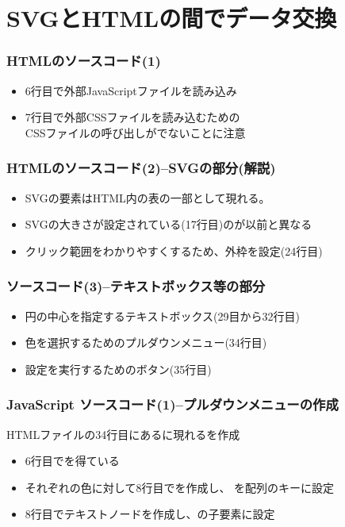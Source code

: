 

\frame{\maketitle}
\section{SVGとHTMLの間でデータ交換}
\begin{frame}[containsverbatim]
 \frametitle{HTMLのソースコード(1)}
 \begin{itemize}
	\item 6行目で外部JavaScriptファイルを読み込み
	\item 7行目で外部CSSファイルを読み込むための\\
        CSSファイルの呼び出しがでないことに注意
 \end{itemize}
\end{frame}
\begin{frame}[containsverbatim]
 \frametitle{HTMLのソースコード(2)--SVGの部分(解説)}
 \begin{itemize}
  \item SVGの要素はHTML内の表の一部として現れる。
  \item SVGの大きさが設定されている(17行目)のが以前と異なる
  \item クリック範囲をわかりやすくするため、外枠を設定(24行目)
 \end{itemize}
\end{frame}
\begin{frame}[containsverbatim]
 \frametitle{ソースコード(3)--テキストボックス等の部分}
 \begin{itemize}
  \item 円の中心を指定するテキストボックス(29目から32行目)
  \item 色を選択するためのプルダウンメニュー(34行目)
  \item 設定を実行するためのボタン(35行目)
 \end{itemize}
\end{frame}
\begin{frame}[containsverbatim]
 \frametitle{JavaScript ソースコード(1)--プルダウンメニューの作成}
 HTMLファイルの34行目にあるに現れるを作成
 \begin{itemize}
	\item 6行目でを得ている
	\item それぞれの色に対して8行目でを作成し、
        を配列のキーに設定
  \item 8行目でテキストノードを作成し、の子要素に設定
 \end{itemize}
\end{frame}
